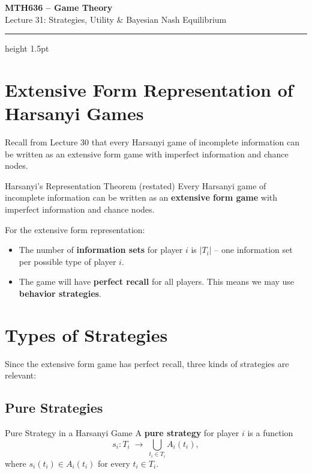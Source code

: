 \documentclass[12pt, a4paper]{article}
\begin{document}
\begin{center}
  {\LARGE\bfseries\sffamily\color{defblue} MTH636 -- Game Theory}\\[6pt]
  {\Large\sffamily Lecture 31: Strategies, Utility \& Bayesian Nash Equilibrium}\\[4pt]
\end{center}
\vspace{0.5cm}
\hrule height 1.5pt
\vspace{0.3cm}

\section{Extensive Form Representation of Harsanyi Games}

Recall from Lecture 30 that every Harsanyi game of incomplete information can be written as an extensive form game with imperfect information and chance nodes.

\begin{thmbox}{Harsanyi's Representation Theorem (restated)}
Every Harsanyi game of incomplete information can be written as an \textbf{extensive form game} with imperfect information and chance nodes.
\end{thmbox}

\noindent For the extensive form representation:
\begin{itemize}
  \item The number of \textbf{information sets} for player $i$ is $|T_i|$ -- one information set per possible type of player $i$.
  \item The game will have \textbf{perfect recall} for all players. This means we may use \textbf{behavior strategies}.
\end{itemize}

\section{Types of Strategies}

Since the extensive form game has perfect recall, three kinds of strategies are relevant:

\subsection{Pure Strategies}

\begin{defbox}{Pure Strategy in a Harsanyi Game}
A \textbf{pure strategy} for player $i$ is a function
\[
  s_i : T_i \;\longrightarrow\; \bigcup_{t_i \in T_i} A_i(t_i),
\]
where $s_i(t_i) \in A_i(t_i)$ for every $t_i \in T_i$.
\end{defbox}
\end{document}
